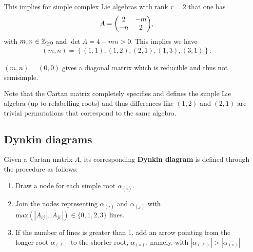 This implies for simple complex Lie algebras with rank $r = 2$ that one has
\begin{align}
    A = \mqty( 2 & -m \\ -n & 2)
,\end{align}
with $m,n \in \mathbb{Z}_{\geq 0}$ and $\det A = 4 - m n > 0$. This implies we have
\begin{align}
    \left( m,n \right) = \left\{ \left( 1,1 \right) , \left( 1,2 \right) , \left( 2,1 \right) , \left( 1,3 \right) , \left( 3,1 \right)  \right\} 
.\end{align}
\begin{note}
    $\left( m,n \right) = \left( 0,0 \right) $ gives a diagonal matrix which is reducible and thus not semisimple.
\end{note}

Note that the Cartan matrix completely specifies and defines the simple Lie algebra (up to relabelling roots) and thus differences like $\left( 1,2 \right) $ and $\left( 2,1 \right) $ are trivial permutations that correspond to the same algebra.

\subsection{Dynkin diagrams}

\begin{definition}
    Given a Cartan matrix $A$, its corresponding \textbf{Dynkin diagram} is defined through the procedure as follows:
    \begin{enumerate}[label=\roman*)]
        \item Draw a node for each simple root $\alpha_{\left( i \right) }$.
        \item Join the nodes representing $\alpha_{\left( i \right) }$ and $\alpha_{\left( j \right) }$ with $\text{max}\left( \left| A_{ij} \right| , \left| A_{ji} \right|  \right) \in \{0, 1, 2, 3\} $ lines.
        \item If the number of lines is greater than 1, add an arrow pointing from the longer root $\alpha_{\left( \ell \right) }$ to the shorter root, $\alpha_{\left( s \right) }$, namely, with $\left| \alpha_{\left( \ell \right) } \right| > \left| \alpha_{\left( s \right) } \right| $
    \end{enumerate}
\end{definition}

